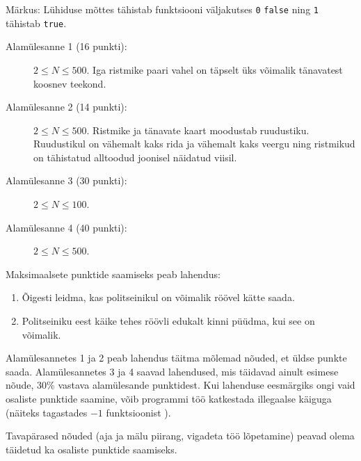 \documentclass{boi2014-et}
\newcommand{\constant}[1]{{\tt #1}}
\begin{document}
    Märkus: Lühiduse mõttes tähistab  funktsiooni väljakutses
    \constant{0} \constant{false} ning \constant{1} tähistab \constant{true}.

    \Scoring

    \begin{description}
        \item[Alamülesanne 1 (16 punkti):] $2 \le N \le 500$.
            Iga ristmike paari vahel on täpselt üks võimalik tänavatest koosnev teekond.
        \item[Alamülesanne 2 (14 punkti):] $2 \le N \le 500$.
            Ristmike ja tänavate kaart moodustab ruudustiku.
            Ruudustikul on vähemalt kaks rida ja vähemalt kaks veergu ning
            ristmikud on tähistatud alltoodud joonisel näidatud viisil.
            \begin{figure}[h!]
               \centering
            \end{figure}
        \item[Alamülesanne 3 (30 punkti):] $2 \le N \le 100$.
        \item[Alamülesanne 4 (40 punkti):] $2 \le N \le 500$.
    \end{description}

    Maksimaalsete punktide saamiseks peab lahendus:
    \begin{enumerate}
        \item Õigesti leidma, kas politseinikul on võimalik röövel kätte saada.
        \item Politseiniku eest käike tehes röövli edukalt kinni püüdma, kui see on võimalik.
    \end{enumerate}

    Alamülesannetes 1 ja 2 peab lahendus täitma mõlemad nõuded, et üldse punkte saada.
    Alamülesannetes 3 ja 4 saavad lahendused, mis täidavad ainult esimese nõude,
    30\% vastava alamülesande punktidest.
    Kui lahenduse eesmärgiks ongi vaid osaliste punktide saamine,
    võib programmi töö katkestada illegaalse käiguga
    (näiteks tagastades $-1$ funktsioonist ).

    Tavapärased nõuded (aja ja mälu piirang, vigadeta töö lõpetamine)
    peavad olema täidetud ka osaliste punktide saamiseks.
\end{document}
